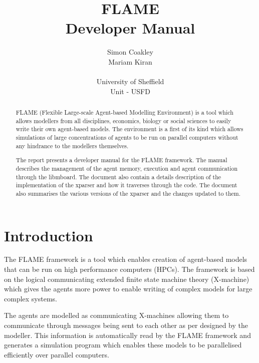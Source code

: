 \documentclass[a4paper,12pt]{article}
\begin{document}
\title{FLAME
\\Developer Manual}
\author{Simon Coakley
\\Mariam Kiran
\\
\\University of Sheffield\\ Unit - USFD}

\maketitle

\begin{abstract}

FLAME (Flexible Large-scale Agent-based Modelling Environment) is a
tool which allows modellers from all disciplines, economics, biology
or social sciences to easily write their own agent-based models. The
environment is a first of its kind which allows simulations of large
concentrations of agents to be run on parallel computers without any
hindrance to the modellers themselves.


The report presents a developer manual for the FLAME framework. The manual
describes the management of the agent memory, execution and
agent communication through the libmboard. The document also contain a details description of the implementation of the xparser and how it traverses through the code. The document also summarises the various versions of the xparser and the changes updated to them. 
\end{abstract}

\pagebreak
\tableofcontents
\pagebreak


\section{Introduction}

The FLAME framework is a tool which enables creation of agent-based models
that can be run on high performance computers (HPCs). The framework
is based on the logical communicating extended finite state
machine theory (X-machine) which gives the agents more power to
enable writing of complex models for large complex systems.

The agents are modelled as communicating X-machines allowing them to
communicate through messages being sent to each other as per
designed by the modeller. This information is automatically read by
the FLAME framework and generates a simulation program which enables
these models to be parallelised efficiently over parallel computers.
\end{document}

